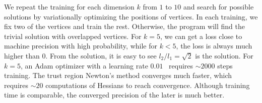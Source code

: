 \documentclass[aps,twocolumn,longbibliography,english,superscriptaddress]{revtex4-1}
\newcommand{\<}{\langle}
\renewcommand{\>}{\rangle}
\theoremstyle{definition}\newtheorem{definition}{\textit{Definition}}
\begin{document}
We repeat the training for each dimension $k$ from $1$ to $10$ and search for possible solutions by variationally optimizing the positions of vertices.
In each training, we fix two of the vertices and train the rest. Otherwise, the program will find the trivial solution with overlapped vertices. 
For $k=5$, we can get a loss close to machine precision with high probability, while for $k < 5$, the loss is always much higher than $0$.
From the solution, it is easy to see $l_2/l_1 = \sqrt{2}$ is the solution.
For $k=5$, an Adam optimizer with a learning rate $0.01$~\cite{Kingma2014} requires $\sim2000$ steps training.
The trust region Newton's method converges much faster, which requires $\sim 20$ computations of Hessians to reach convergence.
Although training time is comparable, the converged precision of the later is much better.
\end{document}
